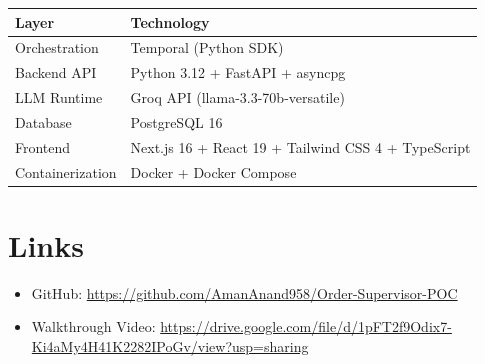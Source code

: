 \documentclass[11pt,a4paper]{article}
\begin{document}
\begin{center}
\begin{tabular}{ll}
\toprule
\textbf{Layer} & \textbf{Technology} \\
\midrule
Orchestration & Temporal (Python SDK) \\
Backend API & Python 3.12 + FastAPI + asyncpg \\
LLM Runtime & Groq API (llama-3.3-70b-versatile) \\
Database & PostgreSQL 16 \\
Frontend & Next.js 16 + React 19 + Tailwind CSS 4 + TypeScript \\
Containerization & Docker + Docker Compose \\
\bottomrule
\end{tabular}
\end{center}

\section*{Links}

\begin{itemize}[nosep]
    \item GitHub: \url{https://github.com/AmanAnand958/Order-Supervisor-POC}
    \item Walkthrough Video: \url{https://drive.google.com/file/d/1pFT2f9Odix7-Ki4aMy4H41K2282IPoGv/view?usp=sharing}
\end{itemize}
\end{document}
